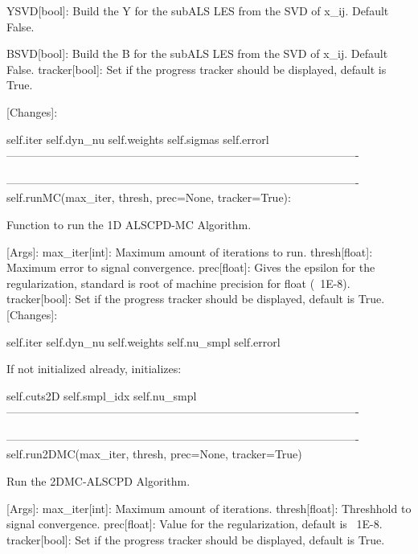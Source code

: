 \begin{DoxyVerb}
                   YSVD[bool]: Build the Y for the subALS LES from the SVD of x_ij. Default False. 

                   BSVD[bool]: Build the B for the subALS LES from the SVD of x_ij. Default False.
                   tracker[bool]: Set if the progress tracker should be displayed, default is True.                                   
                               
           [Changes]:
               
               self.iter
               self.dyn_nu
               self.weights
               self.sigmas
               self.errorl
       ---------------------------------------------------------------------------------------------- 
       
       ----------------------------------------------------------------------------------------------                    
        self.runMC(max_iter, thresh, prec=None, tracker=True):

            Function to run the 1D ALSCPD-MC Algorithm.

            [Args]:
                   max_iter[int]: Maximum amount of iterations to run.
                   thresh[float]: Maximum error to signal convergence.
                   prec[float]: Gives the epsilon for the regularization, standard is root of machine 
                                  precision for float (~1E-8).  
                   tracker[bool]: Set if the progress tracker should be displayed, default is True.                                      
            [Changes]:
                   
                self.iter
                self.dyn_nu
                self.weights
                self.nu_smpl
                self.errorl
                
            If not initialized already, initializes:
                
                self.cuts2D
                self.smpl_idx
                self.nu_smpl                    
       ---------------------------------------------------------------------------------------------- 
       
       ----------------------------------------------------------------------------------------------
       self.run2DMC(max_iter, thresh, prec=None, tracker=True)
          
          Run the 2DMC-ALSCPD Algorithm.

          [Args]:
                  max_iter[int]: Maximum amount of iterations.
                  thresh[float]: Threshhold to signal convergence.
                  prec[float]: Value for the regularization, default is ~1E-8.
                  tracker[bool]: Set if the progress tracker should be displayed, default is True.
                   

\end{DoxyVerb}
